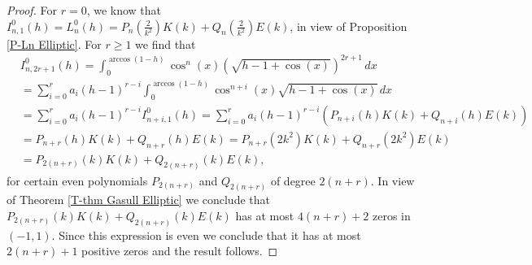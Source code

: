 \documentclass[12pt,psamsfonts]{amsart}
\begin{document}
\begin{proof}
For $r=0$,  we know that $I_{n,1}^0 (h)=L_n^0 (h)= P_{n}(\frac{2}{k^2}) K(k) +
Q_{n}(\frac{2}{k^2}) E(k)$, in view of Proposition \ref{P-Ln Elliptic}. For $r\geq 1$ we find that
\begin{align*}
    &I_{n,2r+1}^0 (h) = \int_0^{\arccos(1-h)} \cos^n(x)\left(\sqrt{h-1+\cos(x)}\right)^{2r+1}  \, dx\\
                        &= \sum_{i=0}^r a_i (h-1)^{r-i}
                                 \int_0^{\arccos(1-h)} \cos^{n+i}(x)\sqrt{h-1+\cos(x)} \, dx\\
                        &= \sum_{i=0}^r a_i (h-1)^{r-i}  I_{n+i,1}^0 (h)= \sum_{i=0}^{r}a_i
                        (h-1)^{r-i}\left (P_{n+i}(h) K(k) + Q_{n+i}(h) E(k) \right)\\
                    &=P_{n+r}(h) K(k)+ Q_{n+r}(h) E(k)=P_{n+r}(2k^2) K(k)+ Q_{n+r}(2k^2) E(k)\\
                    &=P_{2(n+r)}(k) K(k)+ Q_{2(n+r)}(k) E(k),
\end{align*}
for certain even polynomials $P_{2(n+r)}$ and $Q_{2(n+r)}$ of
degree $2(n+r).$ In view of Theorem \ref{T-thm Gasull Elliptic} we
conclude that $P_{2(n+r)}(k) K(k)+ Q_{2(n+r)}(k) E(k)$ has at most
$4(n+r)+2$ zeros in $(-1,1)$. Since this expression is even we conclude that it
has at most $2(n+r)+1$ positive zeros and the result follows.
\end{proof}
\end{document}

